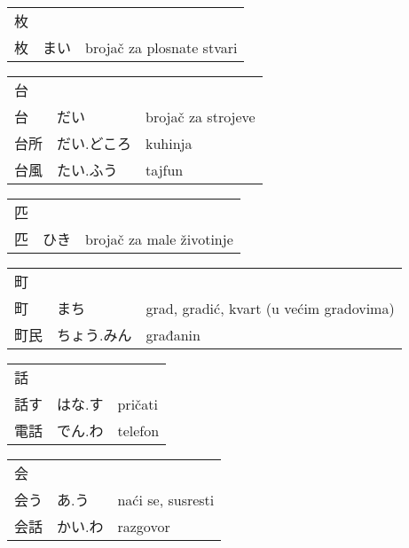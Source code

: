

\newenvironment{dictentry}[1]{
	\begin{tabular}{p{2cm} p{3cm} p{10cm}}
		#1 &&\\
}{
	\end{tabular}
	\vspace{20pt}
}

\newcommand{\example}[3]{
	\hspace*{\fill}#1 & #2 & #3\\
}

\author{ロボット君}


\begin{dictentry}{枚}
\example{枚}{まい}{brojač za plosnate stvari}
\end{dictentry}

\begin{dictentry}{台}
\example{台}{だい}{brojač za strojeve}
\example{台所}{だい.どころ}{kuhinja}
\example{台風}{たい.ふう}{tajfun}
\end{dictentry}

\begin{dictentry}{匹}
\example{匹}{ひき}{brojač za male životinje}
\end{dictentry}

\begin{dictentry}{町}
\example{町}{まち}{grad, gradić, kvart (u većim gradovima)}
\example{町民}{ちょう.みん}{građanin}
\end{dictentry}

\begin{dictentry}{話}
\example{話す}{はな.す}{pričati}
\example{電話}{でん.わ}{telefon}
\end{dictentry}

\begin{dictentry}{会}
\example{会う}{あ.う}{naći se, susresti}
\example{会話}{かい.わ}{razgovor}
\end{dictentry}


